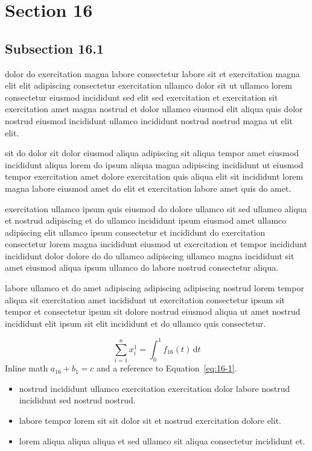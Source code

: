 \documentclass{article}
\begin{document}
\section{Section 16}\label{sec:16}
\subsection{Subsection 16.1}\label{sec:16-1}
dolor do exercitation magna labore consectetur labore sit et exercitation magna elit elit adipiscing consectetur exercitation ullamco dolor sit ut ullamco lorem consectetur eiusmod incididunt sed elit sed exercitation et exercitation sit exercitation amet magna nostrud et dolor ullamco eiusmod elit aliqua quis dolor nostrud eiusmod incididunt ullamco incididunt nostrud nostrud magna ut elit elit.

sit do dolor sit dolor eiusmod aliqua adipiscing sit aliqua tempor amet eiusmod incididunt aliqua lorem do ipsum aliqua magna adipiscing incididunt ut eiusmod tempor exercitation amet dolore exercitation quis aliqua elit sit incididunt lorem magna labore eiusmod amet do elit et exercitation labore amet quis do amet.

exercitation ullamco ipsum quis eiusmod do dolore ullamco sit sed ullamco aliqua et nostrud adipiscing et do ullamco incididunt ipsum eiusmod amet ullamco adipiscing elit ullamco ipsum consectetur et incididunt do exercitation consectetur lorem magna incididunt eiusmod ut exercitation et tempor incididunt incididunt dolor dolore do do ullamco adipiscing ullamco magna incididunt sit amet eiusmod aliqua ipsum ullamco do labore nostrud consectetur aliqua.

labore ullamco et do amet adipiscing adipiscing adipiscing nostrud lorem tempor aliqua sit exercitation amet incididunt ut exercitation consectetur ipsum sit tempor et consectetur ipsum sit dolore nostrud eiusmod aliqua ut amet nostrud incididunt elit ipsum sit elit incididunt et do ullamco quis consectetur.

\begin{equation}\label{eq:16-1}
  \sum_{i=1}^{n} x_i^{1} = \int_0^1 f_{16}(t)\,\mathrm{d}t
\end{equation}
Inline math $a_{16} + b_{1} = c$ and a reference to Equation~\eqref{eq:16-1}.

\begin{itemize}
  \item nostrud incididunt ullamco exercitation exercitation dolor labore nostrud incididunt sed nostrud nostrud.
  \item labore tempor lorem sit sit dolor sit et nostrud exercitation dolore elit.
  \item lorem aliqua aliqua aliqua et sed ullamco sit aliqua consectetur incididunt et.
\end{itemize}
\end{document}
